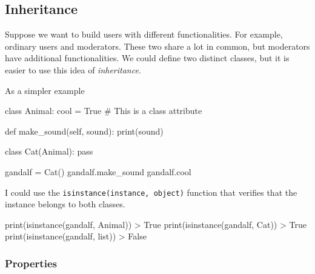 \subsection{Inheritance}

Suppose we want to build users with different functionalities. For example, ordinary users and moderators. These two share a lot in common, but moderators have additional functionalities. We could define two distinct classes, but it is easier to use this idea of \emph{inheritance}.

As a simpler example 
\begin{listing}{1}
class Animal:
    cool = True # This is a class attribute

    def make_sound(self, sound):
        print(sound)
    
class Cat(Animal):
    pass 

gandalf = Cat()
gandalf.make_sound
gandalf.cool
\end{listing}
I could use the \verb|isinstance(instance, object)| function that verifies that the instance belongs to both classes. 
\begin{listingcont}
print(isinstance(gandalf, Animal))
> True
print(isinstance(gandalf, Cat))
> True
print(isinstance(gandalf, list))
> False
\end{listingcont}


\subsubsection{Properties}

